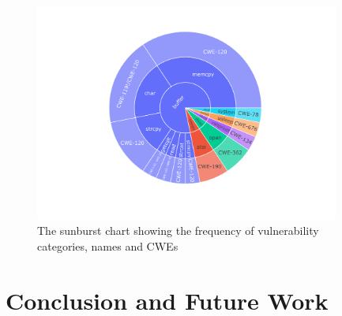 \documentclass[sigconf,screen,balance,natbib=false,timestamp=false,urlbreakonhyphens=true]{acmart}
\begin{document}
  \begin{figure}[h!]
    \centering
    \includegraphics[width=10cm]{../figure/vul_sunburst.pdf}
    \vspace*{-1.5ex}
    \caption{The sunburst chart showing the frequency of vulnerability categories, names and CWEs}
    \label{fig:lcurve-iot}
  \end{figure}


\section{Conclusion and Future Work}
\label{conclusion}



\printbibliography
\end{document}
